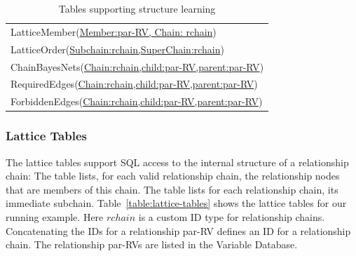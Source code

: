 \begin{table}[tbp]
\caption{Tables supporting structure learning}
 \centering
 \begin{tabular}
[c]{|l|}\hline
LatticeMember(\underline{Member:par-RV, Chain: rchain})\\
LatticeOrder(\underline{Subchain:rchain,SuperChain:rchain})\\
ChainBayesNets(\underline{Chain:rchain,child:par-RV,parent:par-RV})\\
RequiredEdges(\underline{Chain:rchain,child:par-RV,parent:par-RV})\\
ForbiddenEdges(\underline{Chain:rchain,child:par-RV,parent:par-RV})\\
\hline
\end{tabular}
\label{table:laj-tables}
\end{table}
 

\subsubsection{Lattice Tables}


\begin{table}[htdp]
\begin{center}
\end{center}
\label{table:lattice-tables}
\end{table}%

The lattice tables support SQL access to the internal structure of a relationship chain: The  table lists, for each valid relationship chain, the relationship nodes that are members of this chain. The  table lists for each relationship chain, its immediate subchain. Table~\ref{table:lattice-tables} shows the lattice tables for our running example. Here $\mathit{rchain}$ is a custom ID type for relationship chains. Concatenating the IDs for a relationship par-RV defines an ID for a relationship chain. The relationship par-RVs are listed in the Variable Database. 

